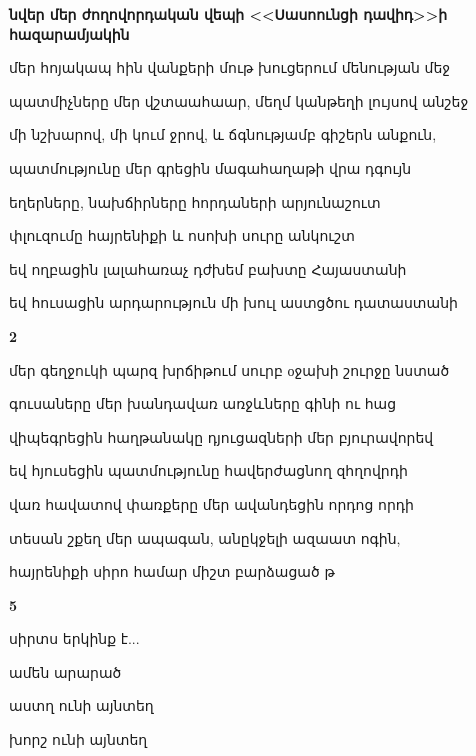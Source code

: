 {\bf նվեր մեր ժողովորդական վեպի <<Սասոունցի դավիդ>>ի հազարամյակին}

                  
մեր հոյակապ հին վանքերի մութ խուցերում մենության մեջ



պատմիչները մեր վշտաահաար, մեղմ կանթեղի լույսով անշեջ



մի նշխարով, մի կում ջրով, և   ճգնությամբ գիշերն անքուն,



պատմությունը մեր գրեցին մագահաղաթի վրա դգույն



եղերները, նախճիրները հորդաների արյունաշուտ



փլուզումը հայրենիքի և ոսոխի սուրը անկուշտ



 եվ ողբացին լալահառաչ դժխեմ բախտը  Հայաստանի


 եվ հուսացին արդարություն մի խուլ աստցծու դատաստանի


  
          \centerline {\bf  2}



          մեր գեղջուկի պարզ խրճիթում սուրբ оջախի շուրջը նստած

             գուսաները մեր խանդավառ առջևները գինի ու հաց


 վիպեգրեցին հաղթանակը դյուցազների մեր բյուրավորեվ



             եվ հյուսեցին պատմությունը հավերժացնող զհղովրդի



             վառ հավատով փառքերը մեր ավանդեցին որդոց որդի


             տեսան շքեղ մեր ապագան, անըկջելի ազաատ ոգին,



             հայրենիքի   սիրո համար միշտ բարձացած թ




\centerline {\bf 5}

                                     սիրտս երկինք է...
                                    

                                    ամեն արարած 


                                    աստղ ունի այնտեղ
                                    
                                   
                                   խորշ  ունի այնտեղ


